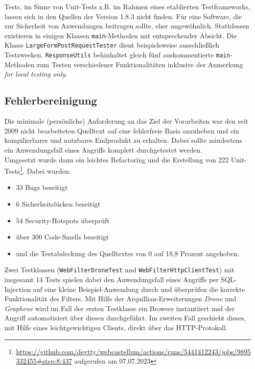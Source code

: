 Tests, im Sinne von Unit-Tests z.B. im Rahmen eines etablierten Testframeworks, lassen sich in den Quellen der Version 1.8.3 nicht finden. Für eine Software, die zur Sicherheit von Anwendungen beitragen sollte, eher ungewöhnlich. Stattdessen existieren in einigen Klassen \verb=main=-Methoden mit entsprechender Absicht. Die Klasse \verb=LargeFormPostRequestTester= dient beispielsweise ausschließlich Testzwecken. \verb=ResponseUtils= behinhaltet gleich fünf auskommentierte \verb=main=-Methoden zum Testen verschiedener Funktionalitäten inklusive der Anmerkung \emph{for local testing only}. 


\subsection{Fehlerbereinigung}

Die minimale (persönliche) Anforderung an das Ziel der Vorarbeiten war den seit 2009 nicht bearbeiteten Quelltext auf eine fehlerfreie Basis anzuheben und ein kompilierbares und nutzbares Endprodukt zu erhalten. Dabei sollte mindestens ein Anwendungsfall eines Angriffs komplett durchgetestet werden.\\
Umgesetzt wurde dann ein leichtes Refactoring und die Erstellung von 222 Unit-Tests\footnote{\url{https://github.com/devtty/webcastellum/actions/runs/5441412243/jobs/9895332455\#step:8:437} aufgerufen am 07.07.2023}. Dabei wurden:

\begin{itemize}
    \item 33 Bugs beseitigt
    \item 6 Sicherheitslücken beseitigt
    \item 54 Security-Hotspots überprüft
    \item über 300 Code-Smells beseitigt
    \item und die Testabdeckung des Quelltextes von 0 auf 18,8 Prozent angehoben.
\end{itemize}

Zwei Testklassen (\verb=WebFilterDroneTest= und \verb=WebFilterHttpClientTest=) mit insgesamt 14 Tests spielen dabei den Anwendungsfall eines Angriffs per SQL-Injection auf eine kleine Beispiel-Anwendung durch und überprüfen die korrekte Funktionalität des Filters. Mit Hilfe der Arquillian-Erweiterungen \emph{Drone} und \emph{Graphene} wird im Fall der ersten Testklasse ein Browser instantiiert und der Angriff automatisiert über diesen durchgeführt. Im zweiten Fall geschieht dieses, mit Hilfe eines leichtgewichtigen Clients, direkt über das HTTP-Protokoll.

